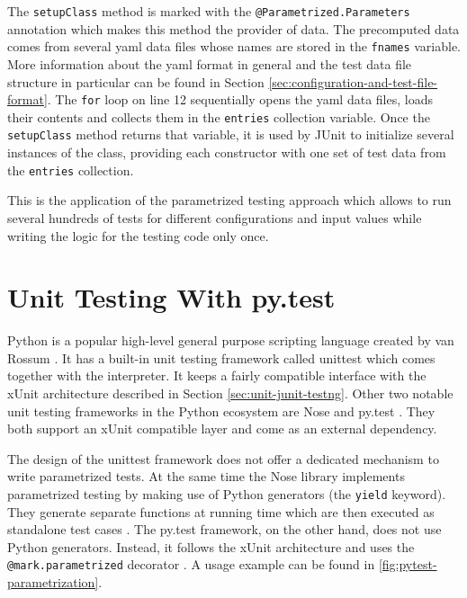 The \texttt{setupClass} method is marked with the \texttt{@Parametrized.Parameters} annotation which makes this method the provider of data. The precomputed data comes from several \gls{yaml} data files whose names are stored in the \texttt{fnames} variable. More information about the \gls{yaml} format in general and the test data file structure in particular can be found in Section \ref{sec:configuration-and-test-file-format}. The \texttt{for} loop on line 12 sequentially opens the \gls{yaml} data files, loads their contents and collects them in the \texttt{entries} collection variable. Once the \texttt{setupClass} method returns that variable, it is used by JUnit to initialize several instances of the class, providing each constructor with one set of test data from the \texttt{entries} collection.

This is the application of the parametrized testing approach which allows to run several hundreds of tests for different configurations and input values while writing the logic for the testing code only once.

\section{Unit Testing With py.test}
\label{sec:unit-pytest}

Python is a popular high-level general purpose scripting language created by van Rossum \cite{python:2017:homepage}. It has a built-in unit testing framework called unittest \cite{python:2017:unittest-homepage} which comes together with the interpreter. It keeps a fairly compatible interface with the xUnit architecture described in Section \ref{sec:unit-junit-testng}. Other two notable unit testing frameworks in the Python ecosystem are Nose \cite{nose:2017:homepage} and py.test \cite{pytest:2017:homepage}. They both support an xUnit compatible layer and come as an external dependency.

The design of the unittest framework does not offer a dedicated mechanism to write parametrized tests. At the same time the Nose library implements parametrized testing by making use of Python generators (the \texttt{yield} keyword). They generate separate functions at running time which are then executed as standalone test cases \cite{nose:2017:parametrized-testing}. The py.test framework, on the other hand, does not use Python generators. Instead, it follows the xUnit architecture and uses the \texttt{@mark.parametrized} decorator \cite{pytest:2017:parametrized-testing}. A usage example can be found in \autoref{fig:pytest-parametrization}.

